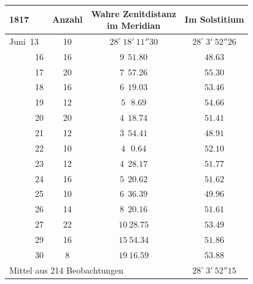 \begin{center}\fontsize{10}{12}\selectfont\setlength{\tabcolsep}{3pt}
\begin{tabular}{l|c|c|c}
1817 & Anzahl & \shortstack{Wahre Zenitdistanz\\im Meridian} & Im Solstitium \\
\hline
Juni\ 13 & 10 & $28^\circ\ 18'\ 11''30$ & $28^\circ\ 3'\ 52''26$ \\
\ \ \ \ \ \ 16 & 16 & $9\ \ 51.80$ & $48.63$ \\
\ \ \ \ \ \ 17 & 20 & $7\ \ 57.26$ & $55.30$ \\
\ \ \ \ \ \ 18 & 16 & $6\ \ 19.03$ & $53.46$ \\
\ \ \ \ \ \ 19 & 12 & $5\ \ \ 8.69$ & $54.66$ \\
\ \ \ \ \ \ 20 & 20 & $4\ \ 18.74$ & $51.41$ \\
\ \ \ \ \ \ 21 & 12 & $3\ \ 54.41$ & $48.91$ \\
\ \ \ \ \ \ 22 & 10 & $4\ \ \ 0.64$ & $52.10$ \\
\ \ \ \ \ \ 23 & 12 & $4\ \ 28.17$ & $51.77$ \\
\ \ \ \ \ \ 24 & 16 & $5\ \ 20.62$ & $51.62$ \\
\ \ \ \ \ \ 25 & 10 & $6\ \ 36.39$ & $49.96$ \\
\ \ \ \ \ \ 26 & 14 & $8\ \ 20.16$ & $51.61$ \\
\ \ \ \ \ \ 27 & 22 & $10\ 28.75$ & $53.49$ \\
\ \ \ \ \ \ 29 & 16 & $15\ 54.34$ & $51.86$ \\
\ \ \ \ \ \ 30 & 8 & $19\ 16.59$ & $53.88$ \\
\multicolumn{3}{l}{Mittel aus 214 Beobachtungen} & $28^\circ\ 3'\ 52''15$ \\
\end{tabular}
\end{center}

